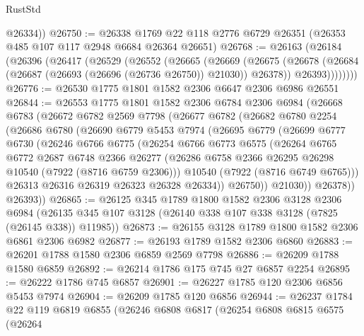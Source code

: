 \begin{lexlean}{RustStd}
\begin{coremodule}
        @26334))
@26750 := @26338 @1769 @22 @118 @2776 @6729 @26351 (@26353 @485 @107 @117 @2948 @6684 @26364 @26651)
@26768 := @26163
    (@26184
      (@26396
        (@26417
          (@26529
            (@26552
              (@26665
                (@26669
                  (@26675
                    (@26678 (@26684 (@26687 (@26693 (@26696 (@26736 @26750)) @21030)) @26378))
                    @26393))))))))
@26776 := @26530 @1775 @1801 @1582 @2306 @6647 @2306 @6986 @26551
@26844 := @26553
    @1775
    @1801
    @1582
    @2306
    @6784
    @2306
    @6984
    (@26668
      @6783
      (@26672
        @6782
        @2569
        @7798
        (@26677
          @6782
          (@26682
            @6780
            @2254
            (@26686
              @6780
              (@26690
                @6779
                @5453
                @7974
                (@26695
                  @6779
                  (@26699
                    @6777
                    @6730
                    (@26246
                      @6766
                      @6775
                      (@26254
                        @6766
                        @6773
                        @6575
                        (@26264
                          @6765
                          @6772
                          @2687
                          @6748
                          @2366
                          @26277
                          (@26286 @6758 @2366 @26295 @26298 @10540 (@7922 (@8716 @6759 @2306)))
                          @10540
                          (@7922 (@8716 @6749 @6765)))
                        @26313
                        @26316
                        @26319
                        @26323
                        @26328
                        @26334))
                    @26750))
                @21030))
            @26378))
        @26393))
@26865 := @26125
    @345
    @1789
    @1800
    @1582
    @2306
    @3128
    @2306
    @6984
    (@26135 @345 @107 @3128 (@26140 @338 @107 @338 @3128 (@7825 (@26145 @338)) @11985))
@26873 := @26155 @3128 @1789 @1800 @1582 @2306 @6861 @2306 @6982
@26877 := @26193 @1789 @1582 @2306 @6860
@26883 := @26201 @1788 @1580 @2306 @6859 @2569 @7798
@26886 := @26209 @1788 @1580 @6859
@26892 := @26214 @1786 @175 @745 @27 @6857 @2254
@26895 := @26222 @1786 @745 @6857
@26901 := @26227 @1785 @120 @2306 @6856 @5453 @7974
@26904 := @26209 @1785 @120 @6856
@26944 := @26237
    @1784
    @22
    @119
    @6819
    @6855
    (@26246
      @6808
      @6817
      (@26254
        @6808
        @6815
        @6575
        (@26264

\end{coremodule}
\end{lexlean}
